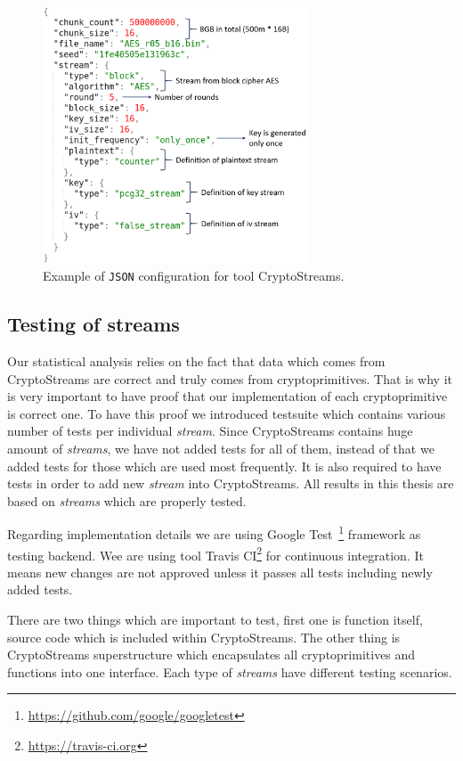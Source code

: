 \documentclass[
    digital,    %
    oneside,    %
    color,
    11pt,
    nocover,
    notable,
    nolof,
    nolot,
    final
]{fithesis3}
\begin{document}
\begin{figure}[h]
	\centering
	\includegraphics[width=0.7\textwidth]{./images/pictures/config.png}
	\caption{Example of \texttt{JSON} configuration for tool CryptoStreams.}
	\label{fig:json-example}
\end{figure}


\subsection{Testing of streams}

Our statistical analysis relies on the fact that data which comes from CryptoStreams are correct and truly comes from cryptoprimitives. That is why it is very important to have proof that our implementation of each cryptoprimitive is correct one. To have this proof we introduced testsuite which contains various number of tests per individual \textit{stream}. Since CryptoStreams contains huge amount of \textit{streams}, we have not added tests for all of them, instead of that we added tests for those which are used most frequently. It is also required to have tests in order to add new \textit{stream} into CryptoStreams. All results in this thesis are based on \textit{streams} which are properly tested.

Regarding implementation details we are using Google Test~\footnote{\url{https://github.com/google/googletest}} framework as testing backend. Wee are using tool Travis CI\footnote{\url{https://travis-ci.org}} for continuous integration. It means new changes are not approved unless it passes all tests including newly added tests. 

There are two things which are important to test, first one is function itself, source code which is included within CryptoStreams. The other thing is CryptoStreams superstructure which encapsulates all cryptoprimitives and functions into one interface. Each type of \textit{streams} have different testing scenarios.
\end{document}
